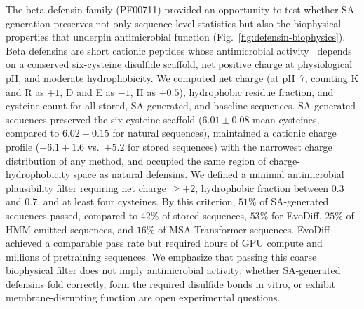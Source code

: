 The beta defensin family (PF00711) provided an opportunity to test whether SA generation preserves not only sequence-level statistics but also the biophysical properties that underpin antimicrobial function (Fig.~\ref{fig:defensin-biophysics}). Beta defensins are short cationic peptides whose antimicrobial activity~\cite{lazzaroAntimicrobialPeptides2020} depends on a conserved six-cysteine disulfide scaffold, net positive charge at physiological pH, and moderate hydrophobicity. We computed net charge (at pH~7, counting K and R as $+1$, D and E as $-1$, H as $+0.5$), hydrophobic residue fraction, and cysteine count for all stored, SA-generated, and baseline sequences. SA-generated sequences preserved the six-cysteine scaffold ($6.01 \pm 0.08$ mean cysteines, compared to $6.02 \pm 0.15$ for natural sequences), maintained a cationic charge profile ($+6.1 \pm 1.6$ vs.\ $+5.2$ for stored sequences) with the narrowest charge distribution of any method, and occupied the same region of charge-hydrophobicity space as natural defensins. We defined a minimal antimicrobial plausibility filter requiring net charge $\geq +2$, hydrophobic fraction between $0.3$ and $0.7$, and at least four cysteines. By this criterion, $51\%$ of SA-generated sequences passed, compared to $42\%$ of stored sequences, $53\%$ for EvoDiff, $25\%$ of HMM-emitted sequences, and $16\%$ of MSA Transformer sequences. EvoDiff achieved a comparable pass rate but required hours of GPU compute and millions of pretraining sequences. We emphasize that passing this coarse biophysical filter does not imply antimicrobial activity; whether SA-generated defensins fold correctly, form the required disulfide bonds in vitro, or exhibit membrane-disrupting function are open experimental questions.
